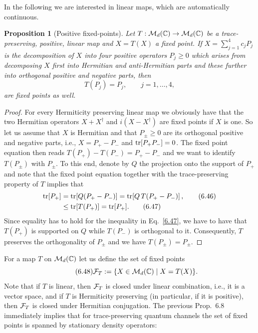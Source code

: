\documentclass[11pt,a4paper]{article}
\theoremstyle{plain}
\newtheorem{proposition}{Proposition}[section]
\theoremstyle{definition}
\theoremstyle{remark}
\begin{document}
In the following we are interested in linear maps, which are automatically
continuous.

\begin{proposition}[Positive fixed-points]
    Let $T:\mathcal{M}_d(\mathbb{C})\to\mathcal{M}_d(\mathbb{C})$ be a trace-preserving, positive, linear map and
    $X=T(X)$ a fixed point. If $X=\sum_{j=1}^4 c_j P_j$ is the decomposition of $X$
    into four positive operators $P_j\ge 0$ which arises from decomposing $X$ first
    into Hermitian and anti-Hermitian parts and these further into orthogonal
    positive and negative parts, then
    \begin{equation}\tag{6.45}
        T(P_j)=P_j,\qquad j=1,\dots,4,
    \end{equation}
    are fixed points as well.
\end{proposition}

\begin{proof}
    For every Hermiticity preserving linear map we obviously have that the two
    Hermitian operators $X+X^\dagger$ and $i(X-X^\dagger)$ are fixed points if $X$ is
    one. So let us assume that $X$ is Hermitian and that $P_\pm\ge 0$ are its
    orthogonal positive and negative parts, i.e., $X=P_+-P_-$ and $\operatorname{tr}[P_+P_-]=0$.
    The fixed point equation then reads $T(P_+)-T(P_-)=P_+-P_-$ and we want to
    identify $T(P_\pm)$ with $P_\pm$. To this end, denote by $Q$ the projection onto
    the support of $P_+$ and note that the fixed point equation together with the
    trace-preserving property of $T$ implies that
    \begin{align}
        \operatorname{tr}[P_+]
         &= \operatorname{tr}[Q(P_+-P_-)]
        = \operatorname{tr}\!\left[Q\,T(P_+-P_-)\right], \tag{6.46}\\
         &\le \operatorname{tr}[T(P_+)] = \operatorname{tr}[P_+]. \tag{6.47}
    \end{align}
    Since equality has to hold for the inequality in Eq.~\eqref{6.47}, we have to
    have that $T(P_+)$ is supported on $Q$ while $T(P_-)$ is orthogonal to it.
    Consequently, $T$ preserves the orthogonality of $P_\pm$ and we have
    $T(P_\pm)=P_\pm$.
\end{proof}

For a map $T$ on $\mathcal{M}_d(\mathbb{C})$ let us define the set of fixed points
\begin{equation}\tag{6.48}
    \mathcal{F}_T := \{X\in\mathcal{M}_d(\mathbb{C})\mid X=T(X)\}.
\end{equation}
Note that if $T$ is linear, then $\mathcal{F}_T$ is closed under linear combination, i.e.,
it is a vector space, and if $T$ is Hermiticity preserving (in particular, if it
is positive), then $\mathcal{F}_T$ is closed under Hermitian conjugation. The previous
Prop.~6.8 immediately implies that for trace-preserving quantum channels the set
of fixed points is spanned by stationary density operators:
\end{document}
